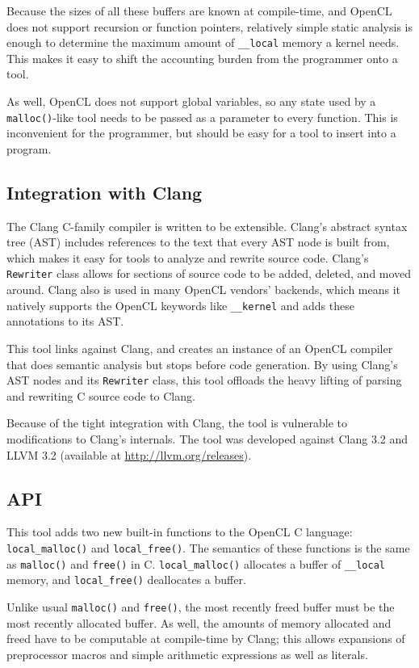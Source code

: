 \documentclass{article}
\begin{document}
Because the sizes of all these buffers are known at compile-time, and OpenCL does not support recursion or function pointers, relatively simple static analysis is enough to determine the maximum amount of \texttt{\_\_local} memory a kernel needs. This makes it easy to shift the accounting burden from the programmer onto a tool.

As well, OpenCL does not support global variables, so any state used by a \texttt{malloc()}-like tool needs to be passed as a parameter to every function. This is inconvenient for the programmer, but should be easy for a tool to insert into a program.

\subsection{Integration with Clang}
The Clang C-family compiler \cite{clang} is written to be extensible. Clang's abstract syntax tree (AST) includes references to the text that every AST node is built from, which makes it easy for tools to analyze and rewrite source code. Clang's \texttt{Rewriter} class allows for sections of source code to be added, deleted, and moved around. Clang also is used in many OpenCL vendors' backends, which means it natively supports the OpenCL keywords like \texttt{\_\_kernel} and adds these annotations to its AST.

This tool links against Clang, and creates an instance of an OpenCL compiler that does semantic analysis but stops before code generation. By using Clang's AST nodes and its \texttt{Rewriter} class, this tool offloads the heavy lifting of parsing and rewriting C source code to Clang.

Because of the tight integration with Clang, the tool is vulnerable to modifications to Clang's internals. The tool was developed against Clang 3.2 and LLVM 3.2 (available at \url{http://llvm.org/releases}).

\subsection{API}
This tool adds two new built-in functions to the OpenCL C language: \texttt{local\_malloc()} and \texttt{local\_free()}. The semantics of these functions is the same as \texttt{malloc()} and \texttt{free()} in C. \texttt{local\_malloc()} allocates a buffer of \texttt{\_\_local} memory, and \texttt{local\_free()} deallocates a buffer.

Unlike usual \texttt{malloc()} and \texttt{free()}, the most recently freed buffer must be the most recently allocated buffer. As well, the amounts of memory allocated and freed have to be computable at compile-time by Clang; this allows expansions of preprocessor macros and simple arithmetic expressions as well as literals.
\end{document}
